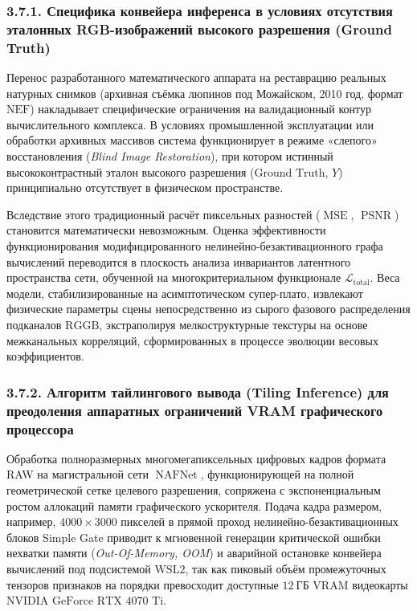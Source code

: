 \documentclass[12pt,a4paper]{article}
\begin{document}
\subsubsection{3.7.1. Специфика конвейера инференса в условиях отсутствия эталонных RGB-изображений высокого разрешения (Ground Truth)}

Перенос разработанного математического аппарата на реставрацию реальных натурных снимков (архивная съёмка люпинов под Можайском, 2010 год, формат $\text{NEF}$) накладывает специфические ограничения на валидационный контур вычислительного комплекса. В условиях промышленной эксплуатации или обработки архивных массивов система функционирует в режиме «слепого» восстановления (\textit{Blind Image Restoration}), при котором истинный высококонтрастный эталон высокого разрешения ($\text{Ground Truth}$, $Y$) принципиально отсутствует в физическом пространстве. 

Вследствие этого традиционный расчёт пиксельных разностей ($\operatorname{MSE}$, $\operatorname{PSNR}$) становится математически невозможным. Оценка эффективности функционирования модифицированного нелинейно-безактивационного графа вычислений переводится в плоскость анализа инвариантов латентного пространства сети, обученной на многокритериальном функционале $\mathcal{L}_{\operatorname{total}}$. Веса модели, стабилизированные на асимптотическом супер-плато, извлекают физические параметры сцены непосредственно из сырого фазового распределения подканалов $\text{RGGB}$, экстраполируя мелкоструктурные текстуры на основе межканальных корреляций, сформированных в процессе эволюции весовых коэффициентов.

\subsubsection{3.7.2. Алгоритм тайлингового вывода (Tiling Inference) для преодоления аппаратных ограничений VRAM графического процессора}

Обработка полноразмерных многомегапиксельных цифровых кадров формата RAW на магистральной сети $\operatorname{NAFNet}$, функционирующей на полной геометрической сетке целевого разрешения, сопряжена с экспоненциальным ростом аллокаций памяти графического ускорителя. Подача кадра размером, например, $4000 \times 3000$ пикселей в прямой проход нелинейно-безактивационных блоков Simple Gate приводит к мгновенной генерации критической ошибки нехватки памяти (\textit{Out-Of-Memory, OOM}) и аварийной остановке конвейера вычислений под подсистемой $\text{WSL2}$, так как пиковый объём промежуточных тензоров признаков на порядки превосходит доступные $12~\text{ГБ}$ $\text{VRAM}$ видеокарты $\text{NVIDIA GeForce RTX 4070 Ti}$.
\end{document}
